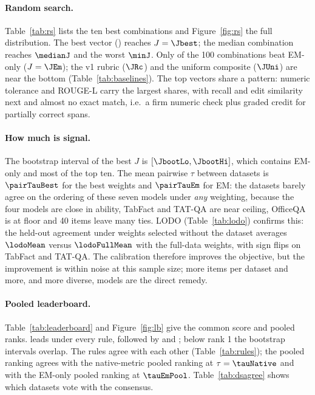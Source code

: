 \documentclass[10pt,twocolumn]{article}
\begin{document}
\paragraph{Random search.} Table~\ref{tab:rs} lists the ten best combinations and Figure~\ref{fig:rs} the full distribution. The best vector (\weightsStr) reaches $J=\Jbest$; the median combination reaches $\medianJ$ and the worst $\minJ$. Only \nAboveEm{} of the 100 combinations beat EM-only ($J=\JEm$); the v1 rubric ($\JRc$) and the uniform composite ($\JUni$) are near the bottom (Table~\ref{tab:baselines}). The top vectors share a pattern: numeric tolerance and ROUGE-L carry the largest shares, with recall and edit similarity next and almost no exact match, i.e.\ a firm numeric check plus graded credit for partially correct spans.
\paragraph{How much is signal.} The bootstrap interval of the best $J$ is $[\JbootLo,\JbootHi]$, which contains EM-only and most of the top ten. The mean pairwise $\tau$ between datasets is $\pairTauBest$ for the best weights and $\pairTauEm$ for EM: the datasets barely agree on the ordering of these seven models under \emph{any} weighting, because the four models are close in ability, TabFact and TAT-QA are near ceiling, OfficeQA is at floor and 40 items leave many ties. LODO (Table~\ref{tab:lodo}) confirms this: the held-out agreement under weights selected without the dataset averages $\lodoMean$ versus $\lodoFullMean$ with the full-data weights, with sign flips on TabFact and TAT-QA. The calibration therefore improves the objective, but the improvement is within noise at this sample size; more items per dataset and more, and more diverse, models are the direct remedy.
\paragraph{Pooled leaderboard.} Table~\ref{tab:leaderboard} and Figure~\ref{fig:lb} give the common score and pooled ranks. \topOne{} leads under every rule, followed by \topTwo{} and \topThree{}; below rank 1 the bootstrap intervals overlap. The rules agree with each other (Table~\ref{tab:rules}); the pooled ranking agrees with the native-metric pooled ranking at $\tau=\tauNative$ and with the EM-only pooled ranking at $\tauEmPool$. Table~\ref{tab:dsagree} shows which datasets vote with the consensus.
\end{document}
